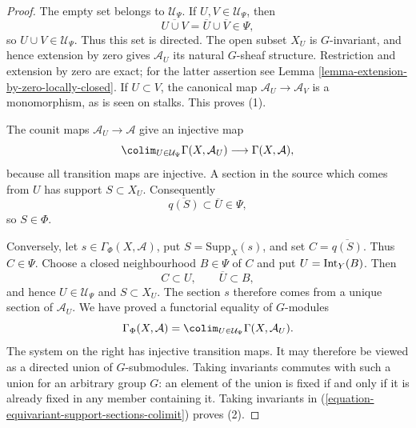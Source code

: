 \begin{proof}
The empty set belongs to $\mathcal U_\Psi$. If
$U,V\in\mathcal U_\Psi$, then
$$
\overline{U\cup V}=\overline U\cup\overline V\in\Psi,
$$
so $U\cup V\in\mathcal U_\Psi$. Thus this set is directed.
The open subset $X_U$ is $G$-invariant, and hence extension by zero gives
$\mathcal A_U$ its natural $G$-sheaf structure. Restriction and extension
by zero are exact; for the latter assertion see Lemma
\ref{lemma-extension-by-zero-locally-closed}. If $U\subset V$, the
canonical map $\mathcal A_U\to\mathcal A_V$ is a monomorphism, as is seen
on stalks. This proves (1).

The counit maps $\mathcal A_U\to\mathcal A$ give an injective map
$$
\colim_{U\in\mathcal U_\Psi}\Gamma(X,\mathcal A_U)
\longrightarrow
\Gamma(X,\mathcal A),
$$
because all transition maps are injective. A section in the source which
comes from $U$ has support $S\subset X_U$. Consequently
$$
\overline{q(S)}\subset\overline U\in\Psi,
$$
so $S\in\Phi$.

Conversely, let $s\in\Gamma_\Phi(X,\mathcal A)$, put
$S=\text{Supp}_X(s)$, and set $C=\overline{q(S)}$. Thus $C\in\Psi$.
Choose a closed neighbourhood $B\in\Psi$ of $C$ and put
$U=\mathop{\rm Int}_Y(B)$. Then
$$
C\subset U,
\qquad
\overline U\subset B,
$$
and hence $U\in\mathcal U_\Psi$ and $S\subset X_U$. The section $s$
therefore comes from a unique section of $\mathcal A_U$. We have proved a
functorial equality of $G$-modules
\begin{equation}
\label{equation-equivariant-support-sections-colimit}
\Gamma_\Phi(X,\mathcal A)
=
\colim_{U\in\mathcal U_\Psi}\Gamma(X,\mathcal A_U).
\end{equation}
The system on the right has injective transition maps. It may therefore be
viewed as a directed union of $G$-submodules. Taking invariants commutes
with such a union for an arbitrary group $G$: an element of the union is
fixed if and only if it is already fixed in any member containing it.
Taking invariants in
(\ref{equation-equivariant-support-sections-colimit}) proves (2).


\end{proof}
